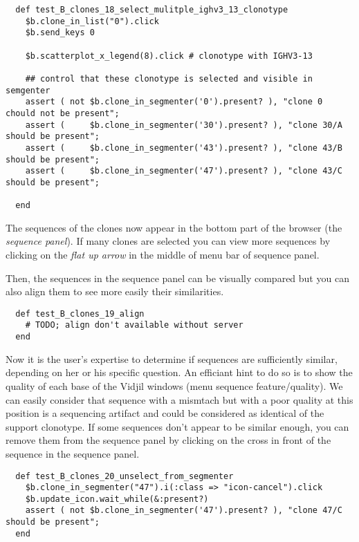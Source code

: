 \begin{verbatim}
  def test_B_clones_18_select_mulitple_ighv3_13_clonotype
    $b.clone_in_list("0").click
    $b.send_keys 0

    $b.scatterplot_x_legend(8).click # clonotype with IGHV3-13

    ## control that these clonotype is selected and visible in semgenter
    assert ( not $b.clone_in_segmenter('0').present? ), "clone 0 chould not be present";
    assert (     $b.clone_in_segmenter('30').present? ), "clone 30/A should be present";
    assert (     $b.clone_in_segmenter('43').present? ), "clone 43/B should be present";
    assert (     $b.clone_in_segmenter('47').present? ), "clone 43/C should be present";

  end
\end{verbatim}

The sequences of the clones now appear in the bottom part of the browser (the
\textit{sequence panel}). If many clones are selected you can view more sequences
by clicking on the \textit{flat up arrow} in the middle of menu bar of sequence panel.
 
Then, the sequences in the sequence panel can be visually compared but you can also align
them to see more easily their similarities.


\begin{verbatim}
  def test_B_clones_19_align
    # TODO; align don't available without server
  end
\end{verbatim}

Now it is the user's expertise to determine if sequences are sufficiently
similar, depending on her or his specific question. 
An efficiant hint to do so is to show the quality of each base of the Vidjil windows (menu sequence feature/quality). 
We can easily consider that sequence with a mismtach but with a poor quality at this position is a sequencing artifact and could be considered as identical of the support clonotype.
If some sequences don't appear to be similar enough, you can remove
them from the sequence panel by clicking on the cross in front of the sequence in
the sequence panel.
\begin{verbatim}
  def test_B_clones_20_unselect_from_segmenter
    $b.clone_in_segmenter("47").i(:class => "icon-cancel").click
    $b.update_icon.wait_while(&:present?)
    assert ( not $b.clone_in_segmenter('47').present? ), "clone 47/C should be present";
  end
\end{verbatim}

